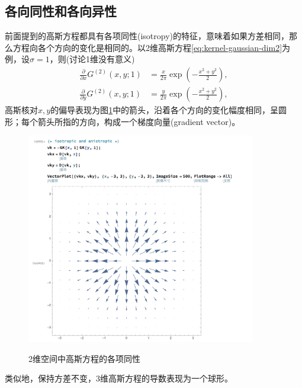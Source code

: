 \begin{subappendices}
\subsection{各向同性和各向异性}
\label{sec:kernel-gaussian-isotropy-anisotropy}
前面提到的高斯方程都具有各项同性(isotropy)的特征，意味着如果方差相同，那么方程向各个方向的变化是相同的。以2维高斯方程\eqref{eq:kernel-gaussian-dim2}为例，设$\sigma =1$，则(讨论1维没有意义)
\begin{equation*}
  \begin{split}
    \frac{\partial}{\partial x} G^{(2)} \left( x,y;1 \right)
    & = \frac{x}{2 \pi}
    \exp \left(  - \frac{x^{2} + y^{2}}{2} \right),\\
    \frac{\partial}{\partial y} G^{(2)} \left( x,y;1 \right)
    & = \frac{y}{2 \pi}
    \exp \left(  - \frac{x^{2} + y^{2}}{2} \right),
  \end{split}
\end{equation*}
高斯核对$x,y$的偏导表现为图\ref{fig:gaussian-isotropy-2d}中的箭头，沿着各个方向的变化幅度相同，呈圆形；每个箭头所指的方向，构成一个梯度向量(gradient vector)。
\begin{figure}[htbp]
  \caption{2维空间中高斯方程的各项同性}
  \centering
  \includegraphics[width=10cm]{./Figures/20180405-isotropy}
  \label{fig:gaussian-isotropy-2d}
%
\end{figure}
类似地，保持方差不变，3维高斯方程的导数表现为一个球形。


\end{subappendices}
